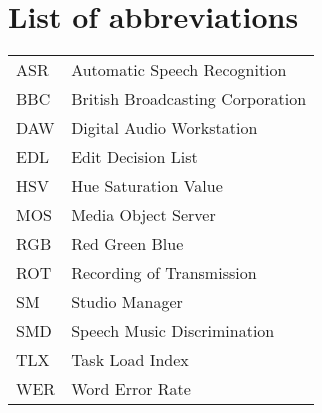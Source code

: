 \chapter*{List of abbreviations}

\begin{tabular}{l l}
ASR & Automatic Speech Recognition \\
BBC & British Broadcasting Corporation \\
DAW & Digital Audio Workstation \\
EDL & Edit Decision List \\
HSV & Hue Saturation Value \\
MOS & Media Object Server \\
RGB & Red Green Blue \\
ROT & Recording of Transmission \\
SM  & Studio Manager \\
SMD & Speech Music Discrimination \\
TLX & Task Load Index \\
WER & Word Error Rate
\end{tabular}

